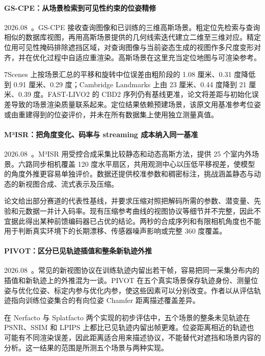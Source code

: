 \paragraph{GS-CPE：从场景检索到可见性约束的位姿精修}
2026.08~\cite{2608_10938}。GS-CPE 接收查询图像和已训练的三维高斯场景。粗定位先检索与查询相似的数据库视图，再用高斯场景提供的几何线索迭代建立二维至三维对应。精定位用可见性掩码排除遮挡区域，对查询图像与当前姿态生成的视图作多尺度变形对齐，并在优化过程中自适应重渲染。高斯场景在这里充当定位地图与可渲染参考。

7Scenes 上按场景汇总的平移和旋转中位误差由粗阶段的 1.08 厘米、0.31 度降低到 0.91 厘米、0.29 度；Cambridge Landmarks 上由 23 厘米、0.44 度降到 21 厘米、0.39 度。FAST-LIVO2 的 CBD2 序列仍有基线更准，论文将差距与初始化误差导致的场景渲染质量联系起来。定位结果依赖预建场景，该原文用基准参考位姿或由重建得到的位姿评价，并未在所有数据集上使用独立测量真值。

\paragraph{M³ISR：把角度变化、码率与 streaming 成本纳入同一基准}
2026.08~\cite{2608_22465}。M³ISR 用受控合成采集比较静态和动态高斯方法，提供 25 个室内外场景。六路同步相机覆盖 120 度水平扇区，共用观测中心以压低平移视差，使模型的角度外推更容易单独评价。数据还提供校准参数和稠密标注，挑战涵盖静态与动态的新视图合成、流式表示及压缩。

论文给出部分赛道的代表性基线，并要求压缩对照把解码所需的参数、潜变量、先验和元数据一并计入码率。现有压缩参考曲线的视图协议等细节并不完整，因此不宜据此得出某种前馈编码器已占优的结论。两秒的合成序列和有限相机角度也不能用于判断真实环境下的长期漂移、传感器噪声影响或完整 360 度覆盖。

\paragraph{PIVOT：区分已见轨迹插值和整条新轨迹外推}
2026.08~\cite{2608_25401}。常见的新视图协议在训练轨迹内留出若干帧，容易把同一采集分布内的插值和新轨迹上的外推混为一谈。PIVOT 在五个真实场景保存轨迹身份、测量位姿与优化位姿、标定内参与优化内参，使这些因素可以分别改变。作者以从评估轨迹指向训练位姿集合的有向位姿 Chamfer 距离描述覆盖差异。

在 Nerfacto 与 Splatfacto 两个实现的初步评估中，五个场景的整条未见轨迹在 PSNR、SSIM 和 LPIPS 上都比已见轨迹内留出帧更难。位姿距离相近的轨迹也可能有不同渲染误差，因此距离适合用来描述协议，不能替代对遮挡和场景内容的分析。这一结果的范围是所测五个场景与两种实现。

